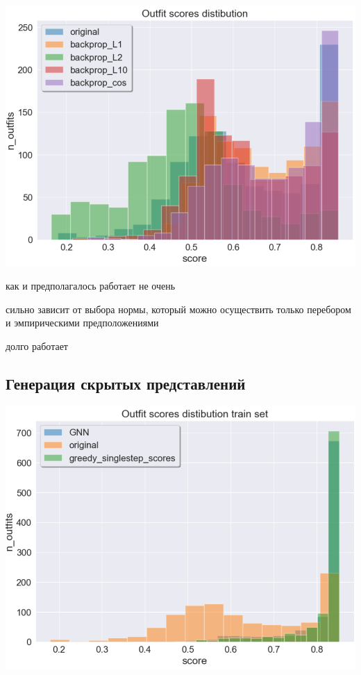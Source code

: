 \documentclass[a4paper,12pt]{article}
\begin{document}
			\includegraphics[scale = 0.7]{../figures/backprop_at_least_5_subset1000.png}
				
			как и предполагалось работает не очень 
			
			сильно зависит от выбора нормы, который можно осуществить только перебором и эмпирическими предположениями
			
			долго работает
			
			\subsection{Генерация скрытых представлений}

					\includegraphics[scale = 0.7]{../figures/GNN_at_least_5_subset1000_train.png}
					
\end{document}
